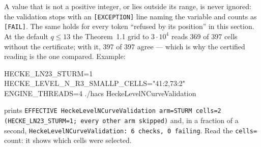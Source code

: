 \documentclass[11pt,openany]{report}
\begin{document}
A value that is not a positive integer, or lies outside its range, is never ignored: the validation stops with an \texttt{[EXCEPTION]} line naming the variable and counts as \texttt{[FAIL]}. The same holds for every token ``refused by its position'' in this section.
At the default $q\le13$ the Theorem~1.1 grid to $3\cdot10^4$ reads 369 of 397 cells without the certificate; with it,
397 of 397 agree --- which is why the certified reading is the one compared. Example:
\begin{shell}
HECKE_LN23_STURM=1 HECKE_LEVEL_N_R3_SMALLP_CELLS="41:2,73:2" ENGINE_THREADS=4 ./hacs HeckeLevelNCurveValidation
\end{shell}
prints \texttt{EFFECTIVE HeckeLevelNCurveValidation arm=STURM cells=2 (HECKE\_LN23\_STURM=1; every other arm skipped)} and, in a
fraction of a second, \texttt{HeckeLevelNCurveValidation: 6 checks, 0 failing}. Read the \texttt{cells=} count: it shows
which cells were selected.
\end{document}
